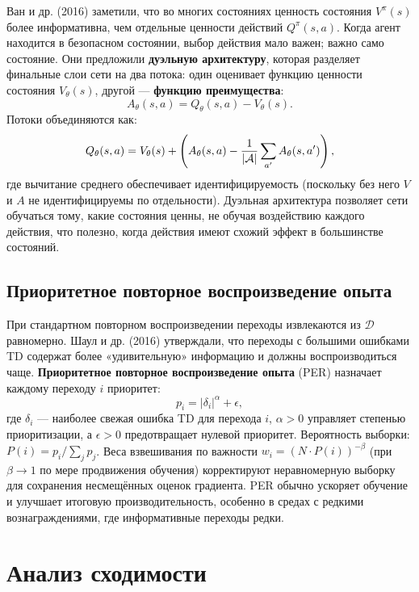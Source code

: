 Ван и др. (2016) заметили, что во многих состояниях ценность состояния $V^\pi(s)$ более информативна, чем отдельные ценности действий $Q^\pi(s, a)$.  Когда агент находится в безопасном состоянии, выбор действия мало важен; важно само состояние.  Они предложили \textbf{дуэльную архитектуру}, которая разделяет финальные слои сети на два потока: один оценивает функцию ценности состояния $V_\theta(s)$, другой --- \textbf{функцию преимущества}:
\[
A_\theta(s, a) = Q_\theta(s, a) - V_\theta(s).
\]
Потоки объединяются как:
\begin{equation}
\label{eq:dueling}
Q_\theta(s, a) = V_\theta(s) + \left(A_\theta(s, a) - \frac{1}{|\mathcal{A}|}\sum_{a'} A_\theta(s, a')\right),
\end{equation}
где вычитание среднего обеспечивает идентифицируемость (поскольку без него $V$ и $A$ не идентифицируемы по отдельности).  Дуэльная архитектура позволяет сети обучаться тому, какие состояния ценны, не обучая воздействию каждого действия, что полезно, когда действия имеют схожий эффект в большинстве состояний.

\subsection{Приоритетное повторное воспроизведение опыта}
\label{subsec:per}

При стандартном повторном воспроизведении переходы извлекаются из $\mathcal{D}$ равномерно.  Шаул и др. (2016) утверждали, что переходы с большими ошибками TD содержат более «удивительную» информацию и должны воспроизводиться чаще.  \textbf{Приоритетное повторное воспроизведение опыта} (PER) назначает каждому переходу $i$ приоритет:
\[
p_i = |\delta_i|^\alpha + \epsilon,
\]
где $\delta_i$ --- наиболее свежая ошибка TD для перехода $i$, $\alpha > 0$ управляет степенью приоритизации, а $\epsilon > 0$ предотвращает нулевой приоритет.  Вероятность выборки: $P(i) = p_i / \sum_j p_j$.  Веса взвешивания по важности $w_i = (N \cdot P(i))^{-\beta}$ (при $\beta \to 1$ по мере продвижения обучения) корректируют неравномерную выборку для сохранения несмещённых оценок градиента.  PER обычно ускоряет обучение и улучшает итоговую производительность, особенно в средах с редкими вознаграждениями, где информативные переходы редки.

\section{Анализ сходимости}
\label{sec:convergence-vfa}


